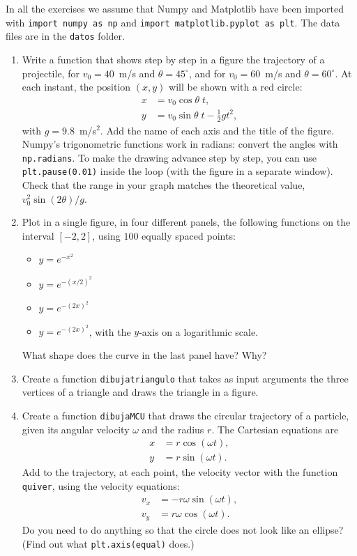In all the exercises we assume that Numpy and Matplotlib have been imported with \texttt{import numpy as np} and \texttt{import matplotlib.pyplot as plt}. The data files are in the \texttt{datos} folder.
\begin{enumerate}
\item Write a function that shows step by step in a figure the trajectory of a projectile, for $v_0=40$~m/s and $\theta=45^\circ$, and for $v_0=60$~m/s and $\theta=60^\circ$. At each instant, the position $(x, y)$ will be shown with a red circle:
\begin{align*}
    x&=v_0 \cos\theta \; t, \\
    y&=v_0 \sin\theta \; t -\frac{1}{2} g t^2,
\end{align*}
with $g=9.8$~m/s$^2$. Add the name of each axis and the title of the figure. Numpy's trigonometric functions work in radians: convert the angles with \texttt{np.radians}. To make the drawing advance step by step, you can use \texttt{plt.pause(0.01)} inside the loop (with the figure in a separate window). Check that the range in your graph matches the theoretical value, $v_0^2\sin(2\theta)/g$.

\item Plot in a single figure, in four different panels, the following functions on the interval $[-2,2]$, using $100$ equally spaced points:
\begin{itemize}
    \item $y=e^{-x^2}$
    \item $y=e^{-(x/2)^2}$
    \item $y=e^{-(2x)^2}$
    \item $y=e^{-(2x)^2}$, with the $y$-axis on a logarithmic scale.
\end{itemize}
What shape does the curve in the last panel have? Why?

\item Create a function \texttt{dibujatriangulo} that takes as input arguments the three vertices of a triangle and draws the triangle in a figure.

\item Create a function \texttt{dibujaMCU} that draws the circular trajectory of a particle, given its angular velocity $\omega$ and the radius $r$. The Cartesian equations are
\begin{align*}
    x&=r\cos(\omega t),\\
    y&=r\sin (\omega t).
\end{align*}
Add to the trajectory, at each point, the velocity vector with the function \texttt{quiver}, using the velocity equations:
\begin{align*}
    v_x&=-r \omega \sin(\omega t),\\
    v_y&=r \omega \cos(\omega t).
\end{align*}
Do you need to do anything so that the circle does not look like an ellipse? (Find out what \texttt{plt.axis(\textquotesingle{}equal\textquotesingle{})} does.)


\end{enumerate}
